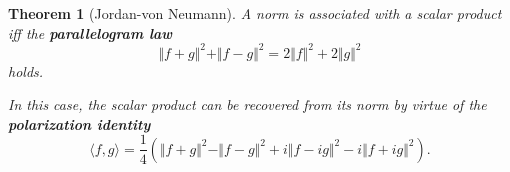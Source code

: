 \documentclass[10pt]{article}
\newtheorem{theorem}[]{Theorem}
\begin{document}
\begin{theorem}[Jordan-von Neumann]
    A norm is associated with a scalar product iff the \textbf{parallelogram law}
    \[\Vert f+g\Vert^2 + \Vert f-g\Vert^2 = 2\Vert f\Vert^2 + 2\Vert g\Vert^2\]
    holds.

    In this case, the scalar product can be recovered from its norm by virtue of the \textbf{polarization identity}
    \[\langle f,g\rangle = \frac{1}{4}(\Vert f+g\Vert^2 -\Vert f-g\Vert^2 + i\Vert f-ig\Vert^2-i\Vert f+ig\Vert^2).\]
\end{theorem}
\end{document}
